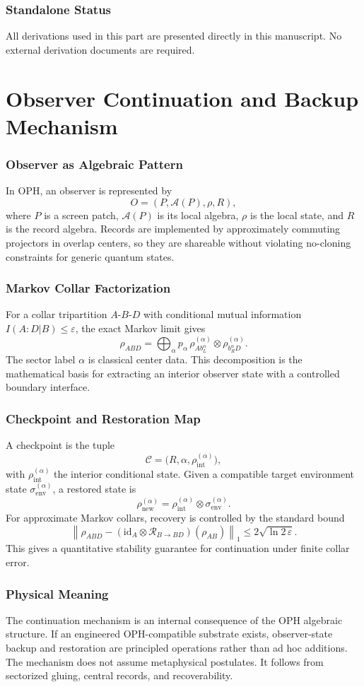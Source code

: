 \documentclass[11pt]{article}
\begin{document}
\section{Standalone Status}
All derivations used in this part are presented directly in this manuscript. No external derivation documents are required.

\clearpage
\part{Observer Continuation and Backup Mechanism}

\section{Observer as Algebraic Pattern}
In OPH, an observer is represented by
\[
O=(P,\mathcal{A}(P),\rho,R),
\]
where $P$ is a screen patch, $\mathcal{A}(P)$ is its local algebra, $\rho$ is the local state, and $R$ is the record algebra. Records are implemented by approximately commuting projectors in overlap centers, so they are shareable without violating no-cloning constraints for generic quantum states.

\section{Markov Collar Factorization}
For a collar tripartition $A$-$B$-$D$ with conditional mutual information $I(A:D|B)\le\varepsilon$, the exact Markov limit gives
\[
\rho_{ABD}
=\bigoplus_{\alpha} p_{\alpha}\,
\rho^{(\alpha)}_{A b_L^{\alpha}}
\otimes
\rho^{(\alpha)}_{b_R^{\alpha} D}.
\]
The sector label $\alpha$ is classical center data. This decomposition is the mathematical basis for extracting an interior observer state with a controlled boundary interface.

\section{Checkpoint and Restoration Map}
A checkpoint is the tuple
\[
\mathcal{C}=\bigl(R,\alpha,\rho_{\mathrm{int}}^{(\alpha)}\bigr),
\]
with $\rho_{\mathrm{int}}^{(\alpha)}$ the interior conditional state. Given a compatible target environment state $\sigma_{\mathrm{env}}^{(\alpha)}$, a restored state is
\[
\rho_{\mathrm{new}}^{(\alpha)}
=
\rho_{\mathrm{int}}^{(\alpha)}
\otimes
\sigma_{\mathrm{env}}^{(\alpha)}.
\]
For approximate Markov collars, recovery is controlled by the standard bound
\[
\left\|
\rho_{ABD}
-
(\mathrm{id}_A\otimes\mathcal{R}_{B\to BD})(\rho_{AB})
\right\|_1
\le
2\sqrt{\ln 2\,\varepsilon}.
\]
This gives a quantitative stability guarantee for continuation under finite collar error.

\section{Physical Meaning}
The continuation mechanism is an internal consequence of the OPH algebraic structure. If an engineered OPH-compatible substrate exists, observer-state backup and restoration are principled operations rather than ad hoc additions. The mechanism does not assume metaphysical postulates. It follows from sectorized gluing, central records, and recoverability.
\end{document}
